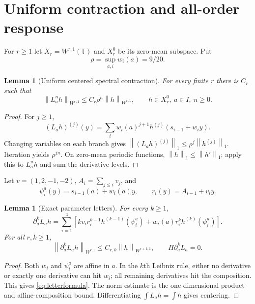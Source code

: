 \documentclass[11pt,reqno]{amsart}
\newtheorem{lemma}[theorem]{Lemma}
\theoremstyle{definition}
\theoremstyle{remark}
\newcommand{\T}{\mathbb T}
\newcommand{\Piop}{\Pi}
\newcommand{\norm}[1]{\left\lVert #1\right\rVert}
\begin{document}
\section{Uniform contraction and all-order response}\label{sec:allorder}

For $r\ge1$ let $X_r=W^{r,1}(\T)$ and $X_r^0$ be its zero-mean subspace.  Put
\[
 \rho=\sup_{a,i}w_i(a)=9/20.
\]

\begin{lemma}[Uniform centered spectral contraction]\label{lem:contraction}
For every finite $r$ there is $C_r$ such that
\[
 \norm{L_a^nh}_{W^{r,1}}
 \le C_r\rho^n\norm h_{W^{r,1}},
 \qquad h\in X_r^0,\ a\in I,\ n\ge0.
\]
\end{lemma}

\begin{proof}
For $j\ge1$,
\[
 (L_ah)^{(j)}(y)=
 \sum_iw_i(a)^{j+1}h^{(j)}(s_{i-1}+w_i y).
\]
Changing variables on each branch gives
$\norm{(L_ah)^{(j)}}_1\le\rho^j\norm{h^{(j)}}_1$.
Iteration yields $\rho^{jn}$.  On zero-mean periodic functions,
$\norm h_1\le\norm{h'}_1$; apply this to $L_a^nh$ and sum the derivative
levels.
\end{proof}

Let $v=(1,2,-1,-2)$, $A_i=\sum_{j\le i}v_j$, and
\[
 \psi_i^a(y)=s_{i-1}(a)+w_i(a)y,
 \qquad r_i(y)=A_{i-1}+v_i y.
\]

\begin{lemma}[Exact parameter letters]\label{lem:letters}
For every $k\ge1$,
\begin{equation}\label{eq:letterformula}
 \partial_a^kL_ah
 =\sum_{i=1}^4\left[
 k v_i r_i^{k-1}h^{(k-1)}(\psi_i^a)
 +w_i(a)r_i^kh^{(k)}(\psi_i^a)
 \right].
\end{equation}
For all $r,k\ge1$,
\[
 \norm{\partial_a^kL_ah}_{W^{r,1}}
 \le C_{r,k}\norm h_{W^{r+k,1}},
 \qquad \Piop\partial_a^kL_a=0.
\]
\end{lemma}

\begin{proof}
Both $w_i$ and $\psi_i^a$ are affine in $a$.  In the $k$th Leibniz rule, either
no derivative or exactly one derivative can hit $w_i$; all remaining
derivatives hit the composition.  This gives \eqref{eq:letterformula}.  The
norm estimate is the one-dimensional product and affine-composition bound.
Differentiating $\int L_ah=\int h$ gives centering.
\end{proof}
\end{document}
